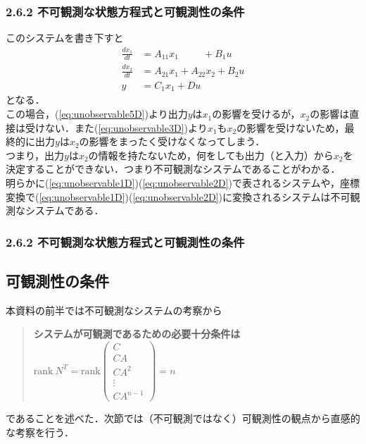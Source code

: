 \begin{frame}[t]
\frametitle{2.6.2 不可観測な状態方程式と可観測性の条件}
このシステムを書き下すと
\begin{align}
 \frac{dx_1}{dt} &= A_{11} x_1 \ \ \ \ \ \ \ \ \ \ \ + B_1 u
\label{eq:unobservable3D} \\
 \frac{dx_2}{dt} &= A_{21} x_1 + A_{22} x_2 + B_2 u
\label{eq:unobservable4D} \\
 y & = C_1 x_1 + Du
\label{eq:unobservable5D}
\end{align}
となる．
\\[3mm]

この場合，(\ref{eq:unobservable5D})より出力$y$は$x_1$の影響を受けるが，$x_2$の影響は直接は受けない．また(\ref{eq:unobservable3D})より$x_1$も$x_2$の影響を受けないため，最終的に出力$y$は$x_2$の影響をまったく受けなくなってしまう．
\\[3mm]

つまり，出力$y$は$x_2$の情報を持たないため，何をしても出力（と入力）から$x_2$を決定することができない．つまり不可観測なシステムであることがわかる．
\\[3mm]

明らかに(\ref{eq:unobservable1D})(\ref{eq:unobservable2D})で表されるシステムや，座標変換で(\ref{eq:unobservable1D})(\ref{eq:unobservable2D})に変換されるシステムは不可観測なシステムである．

\end{frame}

\begin{frame}[t]
\frametitle{2.6.2 不可観測な状態方程式と可観測性の条件}
\subsection{可観測性の条件}

本資料の前半では不可観測なシステムの考察から

\begin{quote}
	{\bf システムが可観測であるための必要十分条件は\\
	$\mbox{rank}\ N^T 
	= \mbox{rank} 
	  \left(\begin{array}{c}
	         C        \\
		 C A      \\
		 C A^2    \\
		 \vdots   \\
		 C A^{n-1}
		\end{array}\right)
	= n$}
\end{quote}

であることを述べた．次節では（不可観測ではなく）可観測性の観点から直感的な考察を行う．
\\[3mm]


\end{frame}

